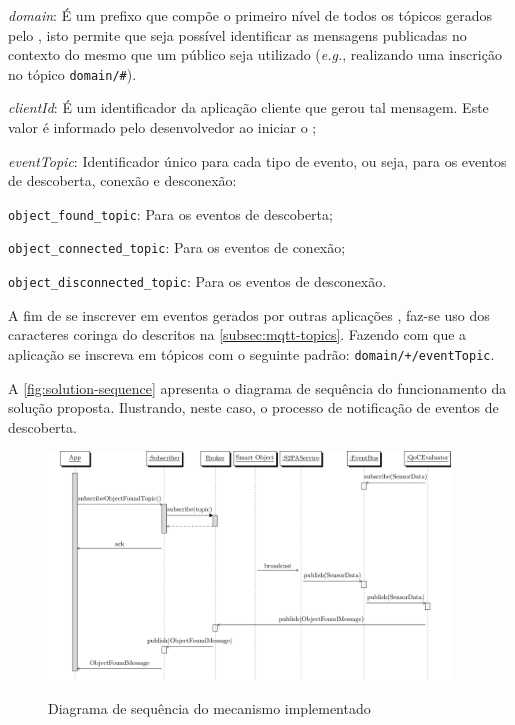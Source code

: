 \begin{alineas}
	\item \emph{domain}: É um prefixo que compõe o primeiro nível de todos os tópicos gerados pelo \cddl, isto permite que seja possível identificar as mensagens publicadas no contexto do \middleware mesmo que um \broker público seja utilizado (\textit{e.g.}, realizando uma inscrição no tópico \texttt{domain/\#}).

	\item \emph{clientId}: É um identificador da aplicação cliente que gerou tal mensagem. Este valor é informado pelo desenvolvedor ao iniciar o \cddl;

	\item \emph{eventTopic}: Identificador único para cada tipo de evento, ou seja, para os eventos de descoberta, conexão e desconexão:
	\begin{alineas}
		\item \texttt{object\_found\_topic}: Para os eventos de descoberta;
		\item \texttt{object\_connected\_topic}: Para os eventos de conexão;
		\item \texttt{object\_disconnected\_topic}: Para os eventos de desconexão.
	\end{alineas}
\end{alineas}


A fim de se inscrever em eventos gerados por outras aplicações \mhubcddl, faz-se uso dos caracteres coringa do \mqtt descritos na \autoref{subsec:mqtt-topics}. Fazendo com que a aplicação se inscreva em tópicos com o seguinte padrão: \texttt{domain/+/eventTopic}.


A \autoref{fig:solution-sequence} apresenta o diagrama de sequência do funcionamento da solução proposta. Ilustrando, neste caso, o processo de notificação de eventos de descoberta.

\begin{figure}[htb]
	\centering
	\caption{Diagrama de sequência do mecanismo implementado}
	\includegraphics[width=0.95\textwidth]{img/solution-sequence.pdf}
	\fonte{\autoriapropria}
	\label{fig:solution-sequence}
\end{figure}

